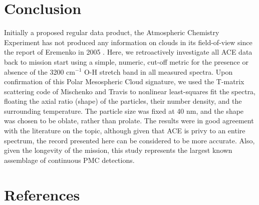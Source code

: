 \documentclass[]{elsarticle}
\begin{document}
\section{Conclusion} \label{sec:conc}
Initially a proposed regular data product, the Atmospheric Chemistry Experiment has not produced any information on clouds in its field-of-view since the report of Eremenko in 2005 \cite{Eremenko2005}. Here, we retroactively investigate all ACE data back to mission start using a simple, numeric, cut-off metric for the presence or absence of the 3200 cm$^{-1}$ O-H stretch band in all measured spectra. Upon confirmation of this Polar Mesospheric Cloud signature, we used the T-matrix scattering code of Mischenko and Travis \cite{Mishchenko1998} to nonlinear least-squares fit the spectra, floating the axial ratio (shape) of the particles, their number density, and the surrounding temperature. The particle size was fixed at 40 nm, and the shape was chosen to be oblate, rather than prolate. The results were in good agreement with the literature on the topic, although given that ACE is privy to an entire spectrum, the record presented here can be considered to be more accurate. Also, given the longevity of the mission, this study represents the largest known assemblage of continuous PMC detections.  


\section{References}


\end{document}
